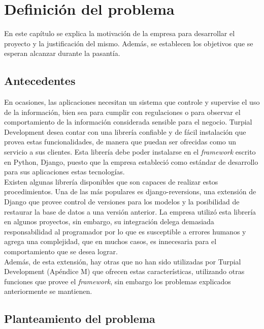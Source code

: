\chapter{\textbf{Definición del problema}}

\thispagestyle{empty}

En este capítulo se explica la motivación de la empresa para desarrollar el
proyecto y la justificación del mismo. Además, se establecen los objetivos que
se esperan alcanzar durante la pasantía.

\section{Antecedentes}

En ocasiones, las aplicaciones necesitan un sistema que controle y supervise el uso de la información, bien sea para cumplir con regulaciones o para observar el comportamiento de la información considerada sensible para el negocio. Turpial Development desea contar con una librería confiable y de fácil instalación que provea estas funcionalidades, de manera que puedan ser ofrecidas como un servicio a sus clientes. Esta librería debe poder instalarse en el \textit{framework} escrito en Python, Django, puesto que la empresa estableció como estándar de desarrollo para sus aplicaciones estas tecnologías. \\

Existen algunas librería disponibles que son capaces de realizar estos
procedimientos. Una de las más populares es django-reversions, una extensión de
Django que provee control de versiones para los modelos y la posibilidad de
restaurar la base de datos a una versión anterior. La empresa utilizó esta
librería en algunos proyectos, sin embargo, su integración delega demasiada
responsabilidad al programador por lo que es susceptible a errores humanos y
agrega una complejidad, que en muchos casos, es innecesaria para el
comportamiento que se desea lograr. \\

Además, de esta extensión, hay otras que no han sido utilizadas por Turpial
Development (Apéndice M) que ofrecen estas características, utilizando otras
funciones que provee el \textit{framework}, sin embargo los problemas explicados
anteriormente se mantienen.

\section{Planteamiento del problema}

